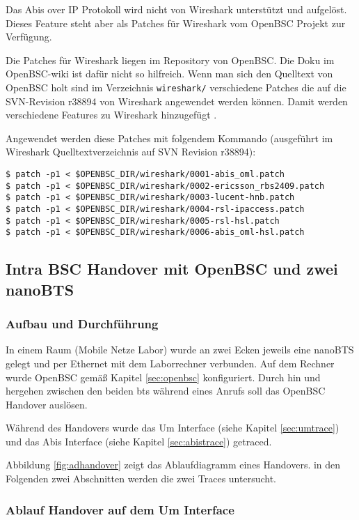 Das Abis over IP Protokoll wird nicht von Wireshark unterstützt und aufgelöst. Dieses Feature steht aber als Patches für Wireshark vom OpenBSC Projekt zur Verfügung.

Die Patches für Wireshark liegen im Repository von OpenBSC. Die Doku im OpenBSC-wiki ist dafür nicht so hilfreich. Wenn man sich den Quelltext von OpenBSC holt sind im Verzeichnis \lstinline{wireshark/} verschiedene Patches die auf die SVN-Revision r38894 von Wireshark angewendet werden können. Damit werden verschiedene Features zu Wireshark hinzugefügt \cite{bib:wiresharkabis, bib:wiresharkabisreadme}.

Angewendet werden diese Patches mit folgendem Kommando (ausgeführt im Wireshark Quelltextverzeichnis auf SVN Revision r38894):
\begin{lstlisting}[caption={Patchen von Wireshark}]
$ patch -p1 < $OPENBSC_DIR/wireshark/0001-abis_oml.patch
$ patch -p1 < $OPENBSC_DIR/wireshark/0002-ericsson_rbs2409.patch
$ patch -p1 < $OPENBSC_DIR/wireshark/0003-lucent-hnb.patch
$ patch -p1 < $OPENBSC_DIR/wireshark/0004-rsl-ipaccess.patch
$ patch -p1 < $OPENBSC_DIR/wireshark/0005-rsl-hsl.patch
$ patch -p1 < $OPENBSC_DIR/wireshark/0006-abis_oml-hsl.patch 
\end{lstlisting}

\subsection{Intra BSC Handover mit OpenBSC und zwei nanoBTS}

\subsubsection{Aufbau und Durchführung}
In einem Raum (Mobile Netze Labor) wurde an zwei Ecken jeweils eine nanoBTS gelegt und per Ethernet mit dem Laborrechner verbunden. Auf dem Rechner wurde OpenBSC gemäß Kapitel \ref{sec:openbsc} konfiguriert. Durch hin und hergehen zwischen den beiden \gls{bts} während eines Anrufs soll das OpenBSC Handover auslösen.

Während des Handovers wurde das Um Interface (siehe Kapitel \ref{sec:umtrace}) und das Abis Interface (siehe Kapitel \ref{sec:abistrace}) getraced.

Abbildung \ref{fig:adhandover} zeigt das Ablaufdiagramm eines Handovers. in den Folgenden zwei Abschnitten werden die zwei Traces untersucht. 

\subsubsection{Ablauf Handover auf dem Um Interface}\label{sec:obsc-um}

